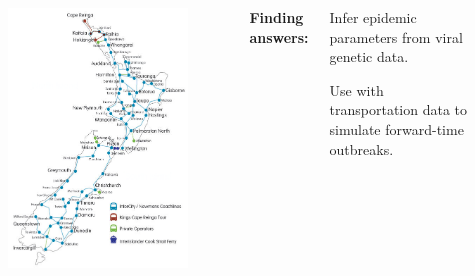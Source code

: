 \documentclass{beamer}
\begin{document}
\begin{frame}
\begin{columns}[c]
\begin{figure}
\includegraphics[width=0.75\linewidth]{map.png}
\end{figure}

\footnotesize{\bf{Finding answers:}}
\begin{itemize}
\scriptsize{
\item Infer epidemic parameters from viral genetic data.
\item Use with transportation data to simulate forward-time outbreaks.}
\end{itemize}
\vspace{3mm}
\end{columns}

\end{frame}
\end{document}
